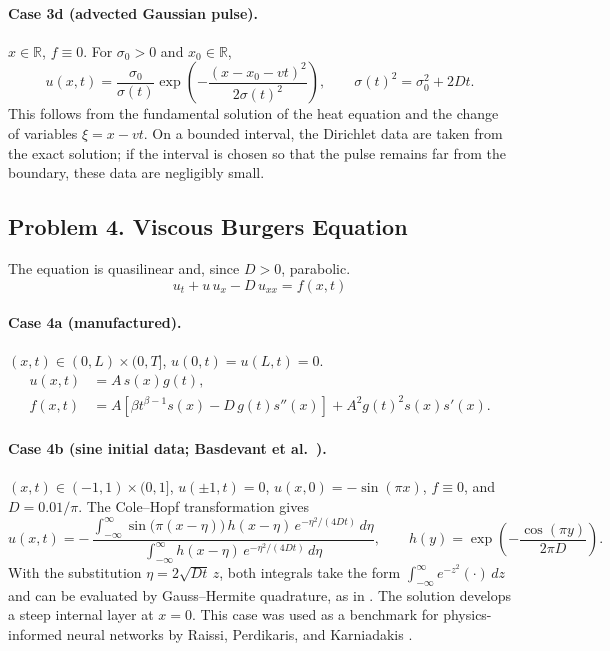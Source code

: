 \documentclass[11pt]{article}
\begin{document}
\paragraph{Case 3d (advected Gaussian pulse).}
$x\in\mathbb{R}$, $f\equiv0$. For $\sigma_0>0$ and $x_0\in\mathbb{R}$,
\[
u(x,t)=\frac{\sigma_0}{\sigma(t)}
\exp\!\left(-\frac{(x-x_0-vt)^2}{2\sigma(t)^2}\right),
\qquad
\sigma(t)^2=\sigma_0^2+2Dt.
\]
This follows from the fundamental solution of the heat equation
\cite[Sec.~2.3]{Eva10} and the change of variables $\xi=x-vt$. On a
bounded interval, the Dirichlet data are taken from the exact solution;
if the interval is chosen so that the pulse remains far from the
boundary, these data are negligibly small.

\subsection*{Problem 4. Viscous Burgers Equation}

The equation is quasilinear and, since $D>0$, parabolic.
\[
\boxed{u_t+u\,u_x-D\,u_{xx}=f(x,t)}
\]

\paragraph{Case 4a (manufactured).}
$(x,t)\in(0,L)\times(0,T]$, $u(0,t)=u(L,t)=0$.
\[
\begin{aligned}
u(x,t)&=A\,s(x)g(t),\\
f(x,t)&=A\left[
\beta t^{\beta-1}s(x)-D\,g(t)s''(x)
\right]
+A^2g(t)^2s(x)s'(x).
\end{aligned}
\]

\paragraph{Case 4b (sine initial data; Basdevant et al.\ \cite{Bas86}).}
$(x,t)\in(-1,1)\times(0,1]$, $u(\pm1,t)=0$, $u(x,0)=-\sin(\pi x)$,
$f\equiv0$, and $D=0.01/\pi$. The Cole--Hopf transformation gives
\[
u(x,t)=-\,\frac{\displaystyle\int_{-\infty}^{\infty}
\sin\bigl(\pi(x-\eta)\bigr)\,h(x-\eta)\,e^{-\eta^2/(4Dt)}\,d\eta}
{\displaystyle\int_{-\infty}^{\infty}
h(x-\eta)\,e^{-\eta^2/(4Dt)}\,d\eta},
\qquad
h(y)=\exp\!\left(-\frac{\cos(\pi y)}{2\pi D}\right).
\]
With the substitution $\eta=2\sqrt{Dt}\,z$, both integrals take the
form $\int_{-\infty}^{\infty}e^{-z^2}(\cdot)\,dz$ and can be evaluated
by Gauss--Hermite quadrature, as in \cite{Bas86}. The solution develops
a steep internal layer at $x=0$. This case was used as a benchmark for
physics-informed neural networks by Raissi, Perdikaris, and Karniadakis
\cite{RPK19}.
\end{document}
